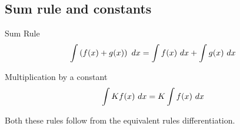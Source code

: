 \subsection{Sum rule and constants}
\begin{thing}{Sum Rule}
\begin{equation}
\int \left( f(x)+g(x) \right)\ dx=\int f(x)\ dx+ \int g(x)\ dx
\end{equation}
\end{thing}
\begin{thing}{Multiplication by a constant}
\begin{equation}
\int K f(x)\ dx=K\int f(x)\ dx
\end{equation}
\end{thing}
Both these rules follow from the equivalent rules differentiation.

